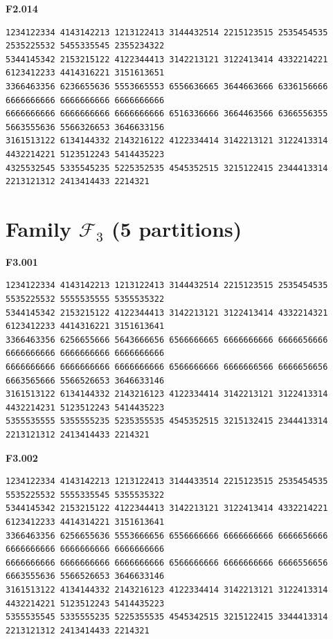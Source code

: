 \noindent\begin{minipage}{\linewidth}\textbf{F2.014}
\begin{lstlisting}
1234122334 4143142213 1213122413 3144432514 2215123515 2535454535 2535225532 5455335545 2355234322
5344145342 2153215122 4122344413 3142213121 3122413414 4332214221 6123412233 4414316221 3151613651
3366463356 6236655636 5553665553 6556636665 3644663666 6336156666 6666666666 6666666666 6666666666
6666666666 6666666666 6666666666 6516336666 3664463566 6366556355 5663555636 5566326653 3646633156
3161513122 6134144332 2143216122 4122334414 3142213121 3122413314 4432214221 5123512243 5414435223
4325532545 5335545235 5225352535 4545352515 3215122415 2344413314 2213121312 2413414433 2214321
\end{lstlisting}
\end{minipage}\par\smallskip

\section*{\texorpdfstring{Family $\mathcal F_3$ (5 partitions)}{Family F3 (5)}}

\noindent\begin{minipage}{\linewidth}\textbf{F3.001}
\begin{lstlisting}
1234122334 4143142213 1213122413 3144432514 2215123515 2535454535 5535225532 5555535555 5355535322
5344145342 2153215122 4122344413 3142213121 3122413414 4332214321 6123412233 4414316221 3151613641
3366463356 6256655666 5643666656 6566666665 6666666666 6666656666 6666666666 6666666666 6666666666
6666666666 6666666666 6666666666 6566666666 6666666566 6666656656 6663565666 5566526653 3646633146
3161513122 6134144332 2143216123 4122334414 3142213121 3122413314 4432214231 5123512243 5414435223
5355535555 5355555235 5235355535 4545352515 3215132415 2344413314 2213121312 2413414433 2214321
\end{lstlisting}
\end{minipage}\par\smallskip

\noindent\begin{minipage}{\linewidth}\textbf{F3.002}
\begin{lstlisting}
1234122334 4143142213 1213122413 3144433514 2215123515 2535454535 5535225532 5555335545 5355535322
5344145342 2153215122 4122344413 3142213121 3122413414 4332214221 6123412233 4414314221 3151613641
3366463356 6256655636 5553666656 6556666666 6666666666 6666656666 6666666666 6666666666 6666666666
6666666666 6666666666 6666666666 6566666666 6666666666 6666556656 6663555636 5566526653 3646633146
3161513122 4134144332 2143216123 4122334414 3142213121 3122413314 4432214221 5123512243 5414435223
5355535545 5335555235 5225355535 4545342515 3215122415 3344413314 2213121312 2413414433 2214321
\end{lstlisting}
\end{minipage}\par\smallskip

